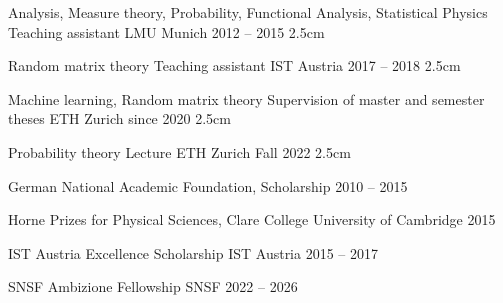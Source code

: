 \documentclass[11pt, a4paper]{awesome-cv}
\begin{document}
\begin{cventries}
  \cventry
    {Analysis, Measure theory, Probability, Functional Analysis, Statistical Physics}
    {Teaching assistant}
    {LMU Munich}
    {2012 -- 2015}
    {}
    {2.5cm}

  \cventry
    {Random matrix theory}
    {Teaching assistant}
    {IST Austria}
    {2017 -- 2018}
    {}
    {2.5cm}

  \cventry
    {Machine learning, Random matrix theory}
    {Supervision of master and semester theses}
    {ETH Zurich}
    {since 2020}
    {}
    {2.5cm}
  
  \cventry
    {Probability theory}
    {Lecture}
    {ETH Zurich}
    {Fall 2022}
    {}
    {2.5cm}

\end{cventries}

\begin{cvhonors}{2cm}
  \cvhonor
    {German National Academic Foundation,} %
    {Scholarship} %
    {} %
    {2010 -- 2015} %

  \cvhonor
    {Horne Prizes for Physical Sciences,} %
    {Clare College} %
    {University of Cambridge} %
    {2015} %

  \cvhonor
    {IST Austria Excellence Scholarship} %
    {} %
    {IST Austria} %
    {2015 -- 2017} %

  \cvhonor
    {SNSF Ambizione Fellowship} %
    {} %
    {SNSF} %
    {2022 -- 2026} %
\end{cvhonors}

\begin{cvskills}



\end{cvskills}


\end{document}
